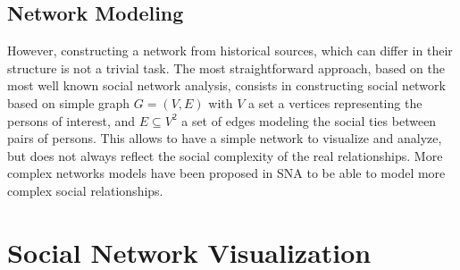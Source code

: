 \subsection{Network Modeling}

However, constructing a network from historical sources, which can differ in their structure is not a trivial task. The most straightforward approach, based on the most well known social network analysis, consists in constructing social network based on simple graph $G = (V, E)$ with $V$ a set a vertices representing the persons of interest, and $E \subseteq V^2$ a set of edges modeling the social ties between pairs of persons.
This allows to have a simple network to visualize and analyze, but does not always reflect the social complexity of the real relationships.
More complex networks models have been proposed in SNA to be able to model more complex social relationships.







\section{Social Network Visualization}









